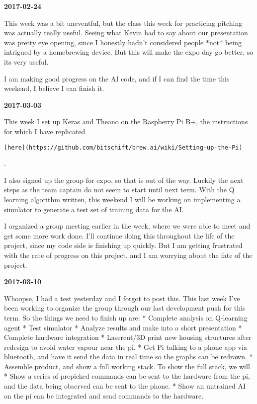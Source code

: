 \textbf{2017-02-24}

This week was a bit uneventful, but the class this week for practicing pitching was actually really useful.
Seeing what Kevin had to say about our presentation was pretty eye opening, since I honestly hadn't considered people *not* being intrigued by a homebrewing device. But this will make the expo day go better, so its very useful.

I am making good progress on the AI code, and if I can find the time this weekend, I believe I can finish it.

\textbf{2017-03-03}

This week I set up Keras and Theano on the Raspberry Pi B+, the instructions for which I have replicated\\
\begin{verbatim}[here](https://github.com/bitschift/brew.ai/wiki/Setting-up-the-Pi)\end{verbatim}.

I also signed up the group for expo, so that is out of the way. Luckily the next steps as the team captain do not seem to start until next term.
With the Q learning algorithm written, this weekend I will be working on implementing a simulator to generate a test set of training data for the AI.

I organized a group meeting earlier in the week, where we were able to meet and get some more work done. I'll continue doing this throughout the life of the project, since my code side is finishing up quickly. But I am getting frustrated with the rate of progress on this project, and I am worrying about the fate of the project.

\textbf{2017-03-10}

Whoopse, I had a test yesterday and I forgot to post this.
This last week I've been working to organize the group through our last development push for this term.
So the things we need to finish up are:
* Complete analysis on Q-learning agent
  * Test simulator
  * Analyze results and make into a short presentation
* Complete hardware integration
  * Lasercut/3D print new housing structures after redesign to avoid water vapour near the pi.
  * Get Pi talking to a phone app via bluetooth, and have it send the data in real time so the graphs can be redrawn.
  * Assemble product, and show a full working stack. To show the full stack, we will
     * Show a series of prepicked commands can be sent to the hardware from the pi, and the data being observed can be sent to the phone.
     * Show an untrained AI on the pi can be integrated and send commands to the hardware.

